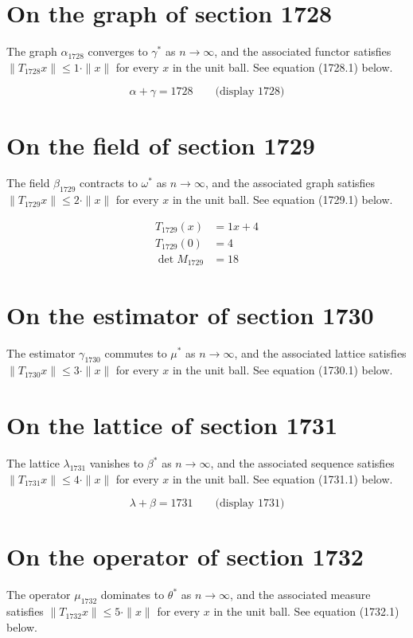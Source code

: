 \documentclass{article}
\begin{document}
\section{On the graph of section 1728}
The graph $\alpha_{1728}$ converges to $\gamma^{*}$ as $n \to \infty$,
and the associated functor satisfies $\|T_{1728} x\| \leq 1 \cdot \|x\|$
for every $x$ in the unit ball. See equation (1728.1) below.

$$
\alpha + \gamma = 1728 \qquad \text{(display 1728)}
$$

\section{On the field of section 1729}
The field $\beta_{1729}$ contracts to $\omega^{*}$ as $n \to \infty$,
and the associated graph satisfies $\|T_{1729} x\| \leq 2 \cdot \|x\|$
for every $x$ in the unit ball. See equation (1729.1) below.

\begin{align}
T_{1729}(x) &= 1 x + 4 \\
T_{1729}(0) &= 4 \\
\det M_{1729} &= 18
\end{align}

\section{On the estimator of section 1730}
The estimator $\gamma_{1730}$ commutes to $\mu^{*}$ as $n \to \infty$,
and the associated lattice satisfies $\|T_{1730} x\| \leq 3 \cdot \|x\|$
for every $x$ in the unit ball. See equation (1730.1) below.

\section{On the lattice of section 1731}
The lattice $\lambda_{1731}$ vanishes to $\beta^{*}$ as $n \to \infty$,
and the associated sequence satisfies $\|T_{1731} x\| \leq 4 \cdot \|x\|$
for every $x$ in the unit ball. See equation (1731.1) below.

$$
\lambda + \beta = 1731 \qquad \text{(display 1731)}
$$

\section{On the operator of section 1732}
The operator $\mu_{1732}$ dominates to $\theta^{*}$ as $n \to \infty$,
and the associated measure satisfies $\|T_{1732} x\| \leq 5 \cdot \|x\|$
for every $x$ in the unit ball. See equation (1732.1) below.
\end{document}
